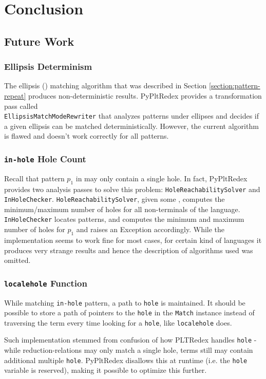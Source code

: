 \chapter{Conclusion}

\section{Future Work}
\subsection{Ellipsis Determinism}
The ellipsis (\RepeatNoArg) matching algorithm that was described in Section \ref{section:pattern-repeat} produces non-deterministic results. PyPltRedex provides a transformation pass called \\ \texttt{EllipsisMatchModeRewriter} that analyzes patterns under ellipses and decides if a given ellipsis can be matched deterministically. However, the current algorithm is flawed and doesn't work correctly for all patterns.

\subsection{\texttt{in-hole} Hole Count}
Recall that pattern $p_1$ in \PatternInHole \space may only contain a single hole. In fact, PyPltRedex provides two analysis passes to solve this problem: \texttt{HoleReachabilitySolver} and \texttt{InHoleChecker}. \texttt{HoleReachabilitySolver}, given some \DefineLanguageNoArg, computes the minimum/maximum number of holes for all non-terminals of the language. \texttt{InHoleChecker} locates \PatternInHoleNoArg patterns, and computes the minimum and maximum number of holes for $p_1$ and raises an Exception accordingly. While the implementation seems to work fine for most cases, for certain kind of languages it produces very strange results and hence the description of algorithms used was omitted.

\subsection{\texttt{localehole} Function}
While matching \texttt{in-hole} pattern, a path to \texttt{hole} is maintained. It should be possible to store a path of pointers to the \texttt{hole} in the \texttt{Match} instance instead of traversing the term every time looking for a \texttt{hole}, like \texttt{localehole} does.

Such implementation stemmed from confusion of how PLTRedex handles \texttt{hole} - while reduction-relations may only match a single hole, terms still may contain additional multiple \texttt{hole}. PyPltRedex disallows this at runtime (i.e. the \texttt{hole} variable is reserved), making it possible to optimize this further.

